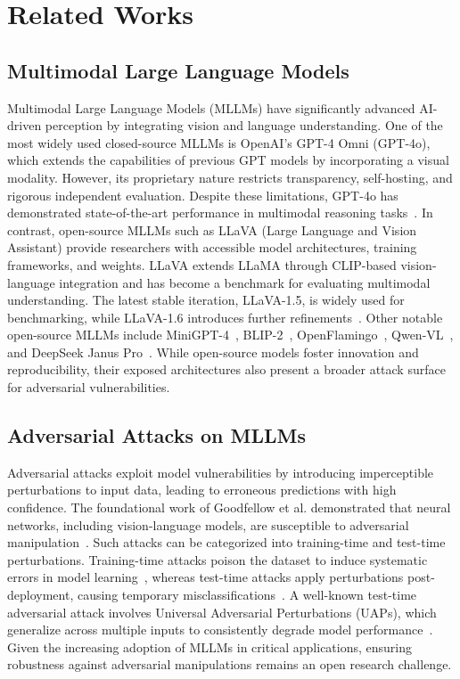 \section{Related Works}
\subsection{Multimodal Large Language Models}
Multimodal Large Language Models (MLLMs) have significantly advanced AI-driven perception by integrating vision and language understanding. One of the most widely used closed-source MLLMs is OpenAI’s GPT-4 Omni (GPT-4o), which extends the capabilities of previous GPT models by incorporating a visual modality. However, its proprietary nature restricts transparency, self-hosting, and rigorous independent evaluation. Despite these limitations, GPT-4o has demonstrated state-of-the-art performance in multimodal reasoning tasks~\cite{shahriar2024putting}. In contrast, open-source MLLMs such as LLaVA (Large Language and Vision Assistant) provide researchers with accessible model architectures, training frameworks, and weights. LLaVA extends LLaMA through CLIP-based vision-language integration and has become a benchmark for evaluating multimodal understanding. The latest stable iteration, LLaVA-1.5, is widely used for benchmarking, while LLaVA-1.6 introduces further refinements~\cite{liu2024visual}. Other notable open-source MLLMs include MiniGPT-4~\cite{zhu2023minigpt}, BLIP-2~\cite{li2023blip}, OpenFlamingo~\cite{awadalla2023openflamingo}, Qwen-VL~\cite{bai2023qwenvl}, and DeepSeek Janus Pro~\cite{chen2025janus}. While open-source models foster innovation and reproducibility, their exposed architectures also present a broader attack surface for adversarial vulnerabilities.

\subsection{Adversarial Attacks on MLLMs}
Adversarial attacks exploit model vulnerabilities by introducing imperceptible perturbations to input data, leading to erroneous predictions with high confidence. The foundational work of Goodfellow et al. demonstrated that neural networks, including vision-language models, are susceptible to adversarial manipulation~\cite{goodfellow2014explaining, papernot2016limitations,mkadry2017towards}. Such attacks can be categorized into training-time and test-time perturbations. Training-time attacks poison the dataset to induce systematic errors in model learning~\cite{wan2023poisoning}, whereas test-time attacks apply perturbations post-deployment, causing temporary misclassifications~\cite{chakraborty2021survey}. A well-known test-time adversarial attack involves Universal Adversarial Perturbations (UAPs), which generalize across multiple inputs to consistently degrade model performance~\cite{moosavidezfooli2017universaladversarialperturbations,lu2024test}. Given the increasing adoption of MLLMs in critical applications, ensuring robustness against adversarial manipulations remains an open research challenge.

